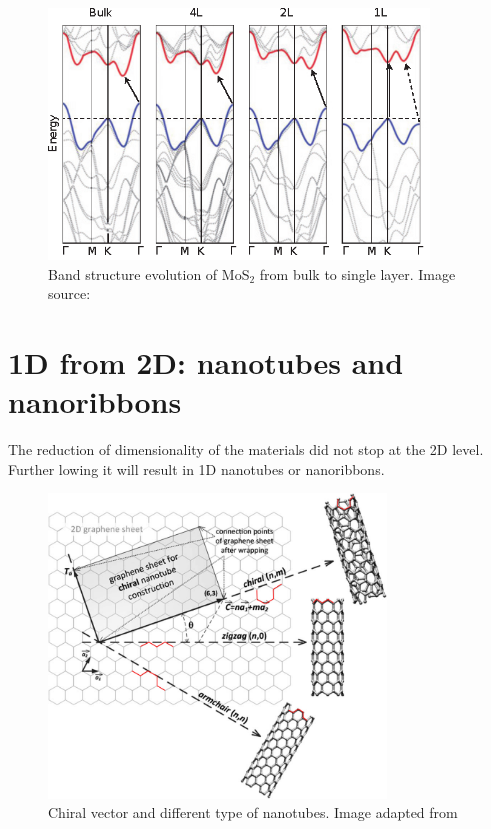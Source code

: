 \begin{figure}[htbp!] 
\centering  
\includegraphics[width=0.9\textwidth]{tmds_bands.eps}
\caption{Band structure evolution of MoS$_2$ from bulk to single layer. Image source: \cite{Chhowalla2013}}  
\label{fig:tmds_bands}
\end{figure} 


\section{1D from 2D: nanotubes and nanoribbons}

The reduction of dimensionality of the materials did not stop at the 2D level. Further lowing it will result in 1D nanotubes or nanoribbons. 

\begin{figure}[htbp!] 
\centering  
\includegraphics[width=0.8\textwidth]{chiral_vector.png}
\caption{Chiral vector and different type of nanotubes. Image adapted from \cite{Prasek2011}}  
\label{fig:chiral}
\end{figure} 

